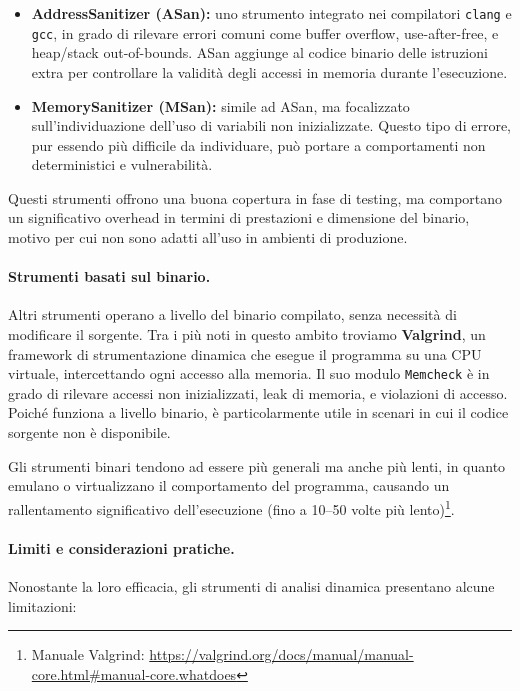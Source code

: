 \begin{itemize}
  \item \textbf{AddressSanitizer (ASan):} uno strumento integrato nei
    compilatori \texttt{clang} e \texttt{gcc}, in grado di rilevare errori comuni
    come buffer overflow, use-after-free, e heap/stack out-of-bounds. ASan
    aggiunge al codice binario delle istruzioni extra per controllare la
    validità degli accessi in memoria durante l'esecuzione.

  \item \textbf{MemorySanitizer (MSan):} simile ad ASan, ma focalizzato sull'individuazione
    dell'uso di variabili non inizializzate. Questo tipo di errore, pur essendo più
    difficile da individuare, può portare a comportamenti non deterministici e
    vulnerabilità.
\end{itemize}

Questi strumenti offrono una buona copertura in fase di testing, ma comportano un
significativo overhead in termini di prestazioni e dimensione del binario,
motivo per cui non sono adatti all'uso in ambienti di produzione.

\paragraph{Strumenti basati sul binario.}
Altri strumenti operano a livello del binario compilato, senza necessità di
modificare il sorgente. Tra i più noti in questo ambito troviamo \textbf{Valgrind},
un framework di strumentazione dinamica che esegue il programma su una CPU virtuale,
intercettando ogni accesso alla memoria. Il suo modulo \texttt{Memcheck} è in
grado di rilevare accessi non inizializzati, leak di memoria, e violazioni di
accesso. Poiché funziona a livello binario, è particolarmente utile in scenari
in cui il codice sorgente non è disponibile.

Gli strumenti binari tendono ad essere più generali ma anche più lenti, in quanto
emulano o virtualizzano il comportamento del programma, causando un
rallentamento significativo dell'esecuzione (fino a 10--50 volte più lento)\footnote{Manuale
Valgrind: \url{https://valgrind.org/docs/manual/manual-core.html\#manual-core.whatdoes}}.

\paragraph{Limiti e considerazioni pratiche.}
Nonostante la loro efficacia, gli strumenti di analisi dinamica presentano
alcune limitazioni:

